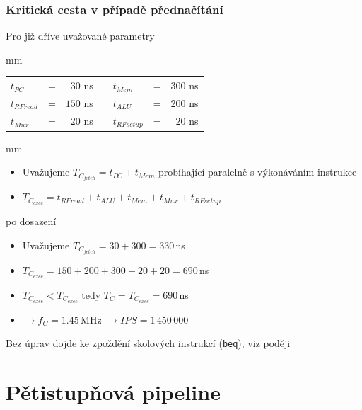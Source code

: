 \documentclass{beamer}
\begin{document}
\begin{frame}
\frametitle{Kritická cesta v případě přednačítání}

Pro již dříve uvažované parametry

 mm

\begin{tabular}{l c r m{1 cm} l c r}
$t_{PC}$ & = & $30$ ns & & $t_{Mem}$ & = & $300$ ns \\
$t_{RFread}$ & = & $150$ ns  & & $t_{ALU}$ & = & $200$ ns \\
$t_{Mux}$ & = & $20$ ns  & & $t_{RFsetup}$ & = & $20$ ns \\
\end{tabular}

 mm

\begin{itemize}
 \item Uvažujeme $T_{C_{fetch}} =  t_{PC} + t_{Mem}$ probíhající paralelně s výkonáváním instrukce
 \item $T_{C_{exec}} = t_{RFread} + t_{ALU} + t_{Mem} + t_{Mux} + t_{RFsetup}$
\end{itemize}

po dosazení

\begin{itemize}
 \item Uvažujeme $T_{C_{fetch}} =  30 + 300 = 330$\,ns
 \item $T_{C_{exec}} = 150 + 200 + 300 + 20 + 20 = 690$\,ns
 \item $T_{C_{exec}} < T_{C_{exec}}$ tedy $T_{C} = T_{C_{exec}} = 690$\,ns
 \item $\rightarrow f_{C} = 1.45$\,MHz $\rightarrow IPS = 1\,450\,000$
\end{itemize}

Bez úprav dojde ke zpoždění skolových instrukcí (\texttt{beq}), viz poději

\end{frame}

\section{Pětistupňová pipeline}
\end{document}
